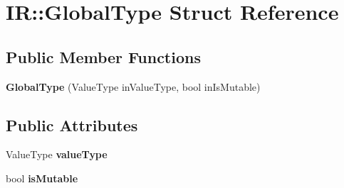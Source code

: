 \hypertarget{struct_i_r_1_1_global_type}{}\section{IR\+:\+:Global\+Type Struct Reference}
\label{struct_i_r_1_1_global_type}
\subsection*{Public Member Functions}
\begin{DoxyCompactItemize}
\item 
\mbox{\label{struct_i_r_1_1_global_type_a699d130326d3073c7bcccc6f163695cc}} 
{\bfseries Global\+Type} (Value\+Type in\+Value\+Type, bool in\+Is\+Mutable)
\end{DoxyCompactItemize}
\subsection*{Public Attributes}
\begin{DoxyCompactItemize}
\item 
\mbox{\label{struct_i_r_1_1_global_type_a43429332d5a181009b292328104c8604}} 
Value\+Type {\bfseries value\+Type}
\item 
\mbox{\label{struct_i_r_1_1_global_type_a739a76fa5520dc533a173224e8082d92}} 
bool {\bfseries is\+Mutable}
\end{DoxyCompactItemize}
